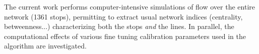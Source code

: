 \documentclass{llncs}
\begin{document}
\vspace*{0.2cm}

The current work performs computer-intensive simulations of flow over the entire network (1361 stops), permitting to extract usual network indices (centrality, betweenness...) characterizing both the stops \emph{and} the lines. In parallel, the computational effects of various fine tuning calibration parameters used in the algorithm are investigated. 




\end{document}
